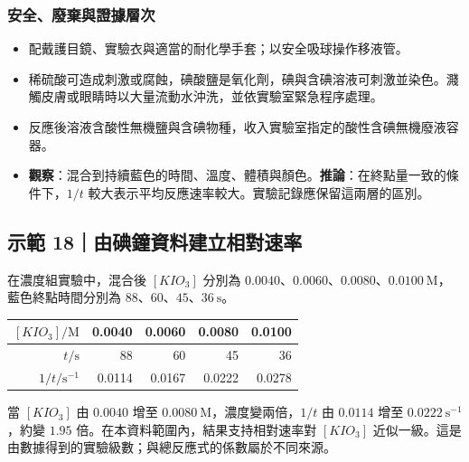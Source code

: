 \documentclass[11pt,a4paper]{article}
\newcounter{none}
\providecommand{\tightlist}{%
  \setlength{\itemsep}{0pt}\setlength{\parskip}{0pt}}
\begin{document}
\subsubsection{安全、廢棄與證據層次}\label{ux5b89ux5168ux5ee2ux68c4ux8207ux8b49ux64daux5c64ux6b21}

\begin{itemize}
\tightlist
\item
  配戴護目鏡、實驗衣與適當的耐化學手套；以安全吸球操作移液管。
\item
  稀硫酸可造成刺激或腐蝕，碘酸鹽是氧化劑，碘與含碘溶液可刺激並染色。濺觸皮膚或眼睛時以大量流動水沖洗，並依實驗室緊急程序處理。
\item
  反應後溶液含酸性無機鹽與含碘物種，收入實驗室指定的酸性含碘無機廢液容器。
\item
  \textbf{觀察}：混合到持續藍色的時間、溫度、體積與顏色。\textbf{推論}：在終點量一致的條件下，\(1/t\) 較大表示平均反應速率較大。實驗記錄應保留這兩層的區別。
\end{itemize}

\begin{HandoutWorkedExample}

\subsection{示範 18｜由碘鐘資料建立相對速率}\label{ux793aux7bc4-18ux7531ux7898ux9418ux8cc7ux6599ux5efaux7acbux76f8ux5c0dux901fux7387}

在濃度組實驗中，混合後 \([KIO_3]\) 分別為 \(0.0040\)、\(0.0060\)、\(0.0080\)、\(0.0100\ \mathrm M\)，藍色終點時間分別為 \(88\)、\(60\)、\(45\)、\(36\ \mathrm s\)。

{\def\LTcaptype{none} %
\begin{longtable}[]{@{}rrrrr@{}}
\toprule\noalign{}
\([KIO_3]/\mathrm M\) & 0.0040 & 0.0060 & 0.0080 & 0.0100 \\
\midrule\noalign{}
\endhead
\bottomrule\noalign{}
\endlastfoot
\(t/\mathrm s\) & 88 & 60 & 45 & 36 \\
\(1/t/\mathrm{s^{-1}}\) & 0.0114 & 0.0167 & 0.0222 & 0.0278 \\
\end{longtable}
}

當 \([KIO_3]\) 由 \(0.0040\) 增至 \(0.0080\ \mathrm M\)，濃度變兩倍，\(1/t\) 由 \(0.0114\) 增至 \(0.0222\ \mathrm{s^{-1}}\)，約變 \(1.95\) 倍。在本資料範圍內，結果支持相對速率對 \([KIO_3]\) 近似一級。這是由數據得到的實驗級數；與總反應式的係數屬於不同來源。

\end{HandoutWorkedExample}
\end{document}
